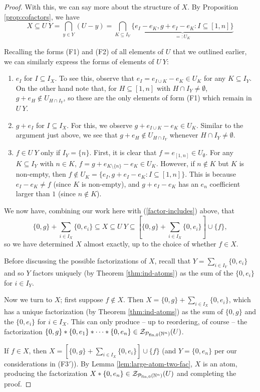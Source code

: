 \begin{proof}
	With this, we can say more about the structure of $X$.
	By Proposition \ref{prop:cofactors}, we have 
	\[X \subseteq U\:Y = \bigcap_{y\in Y}(U-y) = \bigcap_{K\subseteq I_Y} \underbrace{\{e_I - e_K, g+e_I - e_K : I\subseteq [ 1,n ] \}}_{=:U_K} \]
	
	Recalling the forms (F1) and (F2) of all elements of $U$ that we outlined earlier, we can similarly express the forms of elements of $U\:Y$:
	\begin{enumerate}[label={\rm (F\arabic{*}$'$)}]
		\item $e_I$ for $I\subseteq I_X$. 
		To see this, observe that $e_I = e_{I\cup K}-e_K\in U_K$ for any $K\subseteq I_Y$.
		On the other hand note that, for $H \subseteq [ 1,n ]$ with $H\cap I_Y\neq \emptyset$, $g+e_H\notin U_{H\cap I_Y}$, so these are the only elements of form (F1) which remain in $U\:Y$.
		\item $g+e_I$ for $I\subseteq I_X$.
		For this, we observe $g+e_{I\cup K} - e_K\in U_K$. 
		Similar to the argument just above, we see that $g+e_H\notin U_{H\cap I_Y}$ whenever $H\cap I_Y\neq\emptyset$.
		\item $f\in U\:Y$ only if $I_Y = \{n\}$.
		First, it is clear that $f = e_{[ 1,n ]} \in U_\emptyset$.
		For any $K\subseteq I_Y$ with $n\in K$, $f = g+ e_{K\setminus\{n\}} - e_K\in U_K$.
		However, if $n\notin K$ but $K$ is non-empty, then $f\notin U_K = \{e_I, g+e_I-e_K: I\subseteq [1,n]\}$.
		This is because $e_I - e_K \neq f$ (since $K$ is non-empty), and $g+e_I-e_K$ has an $e_n$ coefficient larger than $1$ (since $n\notin K$).
	\end{enumerate}
	We now have, combining our work here with (\ref{factor-includes}) above, that
	\[ \{0,g\} + \sum_{i\in I_X}\{0,e_i\} \subseteq X \subseteq U\:Y \subseteq \left[\{0,g\}+\sum_{i\in I_X} \{0,e_i\} \right]\cup\{f\},\]
	so we have determined $X$ almost exactly, up to the choice of whether $f\in X$.
	
	Before discussing the possible factorizations of $X$, recall that $Y = \sum_{i\in I_Y} \{0,e_i\}$ and so $Y$ factors uniquely (by Theorem \ref{thm:ind-atoms}) as the sum of the $\{0,e_i\}$ for $i\in I_Y$.
	
	Now we turn to $X$; first suppose $f\notin X$.
	Then $X = \{0,g\} +\sum_{i\in I_X} \{0,e_i\}$, which has a unique factorization (by Theorem \ref{thm:ind-atoms}) as the sum of $\{0,g\}$ and the $\{0,e_i\}$ for $i\in I_X$.
	This can only produce -- up to reordering, of course -- the factorization $\{0,g\}*\{0,e_1\}*\cdots*\{0,e_n\}\in \mathcal{Z}_{\mathcal{P}_{\textrm{fin}, 0}(\mathbb{N}^n)}(U)$.
	
	If $f\in X$, then $X = \left[\{0,g\}+\sum_{i\in I_X} \{0,e_i\} \right]\cup\{f\}$ (and $Y = \{0,e_n\}$ per our considerations in (F3$'$)).
	By Lemma \ref{lem:large-atom-two-fac}, $X$ is an atom, producing the factorization $X*\{0,e_n\}\in \mathcal{Z}_{\mathcal{P}_{\textrm{fin}, 0}(\mathbb{N}^n)}(U)$ and completing the proof.
\end{proof}


